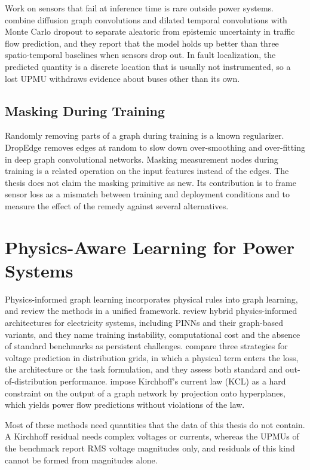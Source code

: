 \documentclass[MTech]{ugthesis}
\begin{document}
Work on sensors that fail at inference time is rare outside power systems. \citet{kirthan2026} combine diffusion graph convolutions and dilated temporal convolutions with Monte Carlo dropout to separate aleatoric from epistemic uncertainty in traffic flow prediction, and they report that the model holds up better than three spatio-temporal baselines when sensors drop out. In fault localization, the predicted quantity is a discrete location that is usually not instrumented, so a lost \ac{UPMU} withdraws evidence about buses other than its own.

\subsection{Masking During Training}

Randomly removing parts of a graph during training is a known regularizer. DropEdge \citep{rong2020} removes edges at random to slow down over-smoothing and over-fitting in deep graph convolutional networks. Masking measurement nodes during training is a related operation on the input features instead of the edges. The thesis does not claim the masking primitive as new. Its contribution is to frame sensor loss as a mismatch between training and deployment conditions and to measure the effect of the remedy against several alternatives.

\section{Physics-Aware Learning for Power Systems}

Physics-informed graph learning incorporates physical rules into graph learning, and \citet{peng2022} review the methods in a unified framework. \citet{nyangon2026} review hybrid physics-informed architectures for electricity systems, including \acp{PINN} and their graph-based variants, and they name training instability, computational cost and the absence of standard benchmarks as persistent challenges. \citet{okoyomon2025} compare three strategies for voltage prediction in distribution grids, in which a physical term enters the loss, the architecture or the task formulation, and they assess both standard and out-of-distribution performance. \citet{dogoulis2025} impose Kirchhoff's current law (\ac{KCL}) as a hard constraint on the output of a graph network by projection onto hyperplanes, which yields power flow predictions without violations of the law.

Most of these methods need quantities that the data of this thesis do not contain. A Kirchhoff residual needs complex voltages or currents, whereas the \acp{UPMU} of the benchmark report \ac{RMS} voltage magnitudes only, and residuals of this kind cannot be formed from magnitudes alone.
\end{document}

